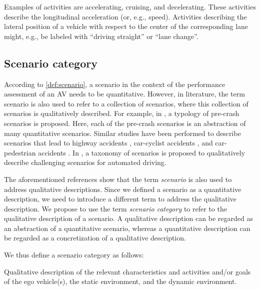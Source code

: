 Examples of activities are accelerating, cruising, and decelerating. These activities describe the longitudinal acceleration (or, e.g., speed). Activities describing the lateral position of a vehicle with respect to the center of the corresponding lane might, e.g., be labeled with ``driving straight'' or ``lane change''.




\subsection{Scenario category}
\label{sec:scenario category}

\cstartd According to \cendd \cref{def:scenario}, a scenario in the context of the performance assessment of an AV needs to be quantitative. 
However, in literature, the term scenario is also used to refer to a collection of scenarios, where this collection of scenarios is \cstartd qualitatively \cendd described. For example, in \autocite{USDoT2007precrashscenarios}, a typology of pre-crash scenarios is proposed. Here, each of the pre-crash scenarios is an abstraction of many quantitative scenarios. Similar studies have been performed to describe scenarios that lead to highway accidents \autocite{adaptive2017d73}, car-cyclist accidents \autocite{opdencamp2014cats}, and car-pedestrian accidents \autocite{lenard2014typical}. In \autocite{catapult2017taxonomy}, a taxonomy of scenarios is proposed to qualitatively describe challenging scenarios for automated driving.

The aforementioned references \autocite{USDoT2007precrashscenarios, adaptive2017d73, opdencamp2014cats, lenard2014typical, catapult2017taxonomy} show that the term \emph{scenario} is also used to address qualitative descriptions. Since we defined a scenario as a quantitative description, we need to introduce a different term to address the qualitative description. We propose to use the term \emph{scenario category} to refer to the qualitative description of a scenario. A qualitative description can be regarded as an abstraction of a quantitative scenario, whereas a quantitative description can be regarded as a concretization of a qualitative description.

We thus define a scenario category as follows:
\begin{definition} \label{def:scenario category}	
	\cstartd Qualitative description of the relevant characteristics and activities and/or goals of the ego vehicle(s), the static environment, and the dynamic environment. \cendd
\end{definition}

